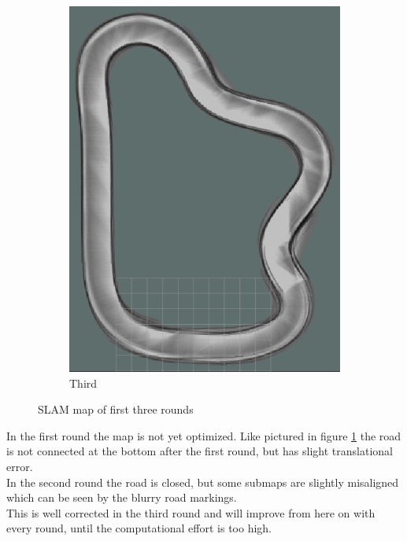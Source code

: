 \begin{figure}
\begin{subfigure}{.3\linewidth}
		\includegraphics[width=\textwidth]{Pictures/1slamtest3}
		\caption{Third}
	\end{subfigure}

	\caption{SLAM map of first three rounds}
	\label{1slamtest}

\end{figure}

In the first round the map is not yet optimized. Like pictured in  figure \ref{1slamtest} the road is not connected at the bottom after the first round, but has slight translational error.\\
In the second round the road is closed, but some submaps are slightly misaligned which can be seen by the blurry road markings.\\
This is well corrected in the third round and will improve from here on with every round, until the computational effort is too high.\\

